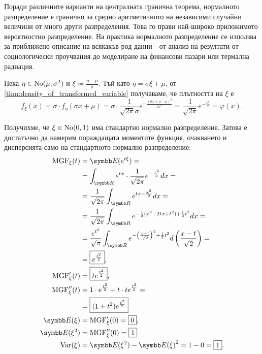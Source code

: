 \documentclass[
  headings=standardclasses,
  bibliography=totocnumbered,
]{scrartcl}
\begin{document}
Поради различните варианти на централната гранична теорема, нормалното разпределение е гранично за средно аритметичното на независими случайни величини от много други разпределения. Това го прави най-широко приложимото вероятностно разпределение. На практика нормалното разпределение се използва за приближено описание на всякакъв род данни - от анализ на резултати от социологически проучвания до моделиране на финансови пазари или термална радиация.

Нека \( \eta \in \operatorname{No}(\mu, \sigma^2) \) и \( \xi \coloneqq \frac {\eta - \mu} \sigma \). Тъй като \( \eta = \sigma \xi + \mu \), от \cref{thm:density_of_transformed_variable} получаваме, че плътността на \( \xi \) е
\begin{equation*}
  f_\xi(x)
  =
  \sigma \cdot f_\eta(\sigma x + \mu)
  =
  \sigma \cdot \frac 1 {\sqrt{2\pi} \sigma} e^{-\frac{{(\sigma x + \mu -\mu)}^2} {2\sigma^2}}
  =
  \frac 1 {\sqrt{2\pi}} e^{-\frac {x^2} 2}
  =
  \varphi(x).
\end{equation*}

Получихме, че \( \xi \in \operatorname{No}(0, 1) \) има стандартно нормално разпределение. Затова е достатъчно да намерим пораждащата моментите функция, очакването и дисперсията само на стандартното нормално разпределение:
\begingroup
\allowdisplaybreaks
\begin{align*}
  \MGF_\xi(t)
  &=
  \Expect(e^{t\xi})
  = \\ &=
  \int_{\R} e^{tx} \cdot \frac 1 {\sqrt{2\pi}} e^{-\frac {x^2} 2} dx
  = \\ &=
  \frac 1 {\sqrt{2\pi}} \int_{\R} e^{tx -\frac {x^2} 2} dx
  = \\ &=
  \frac 1 {\sqrt{2\pi}} \int_{\R} e^{- \frac 1 2 (x^2 - 2tx + t^2) + \frac 1 2 t^2} dx
  = \\ &=
  \frac {e^{t^2}} {\sqrt \pi} \int_{\R} e^{- {\left(\frac {x - t} {\sqrt 2} \right)}^2 + \frac 1 2 t^2} d\left( \frac {x - t} {\sqrt 2} \right)
  = \\ &=
  \boxed{e^{\frac {t^2} 2}},
  \\
  \MGF'_\xi(t)
  &=
  \boxed{t e^{\frac {t^2} 2}},
  \\
  \MGF''_\xi(t)
  &=
  1 \cdot e^{\frac {t^2} 2} + t \cdot t e^{\frac {t^2} 2}
  = \\ &=
  \boxed{(1 + t^2) e^{\frac {t^2} 2}}
  \\
  \Expect(\xi)
  &=
  \MGF'_\xi(0)
  =
  \boxed{0},
  \\
  \Expect(\xi^2)
  &=
  \MGF''_\xi(0)
  =
  \boxed{1}
  \\
  \Var(\xi)
  &=
  \Expect(\xi^2) - {\Expect(\xi)}^2
  =
  1 - 0
  =
  \boxed{1}.
\end{align*}
\endgroup
\end{document}
